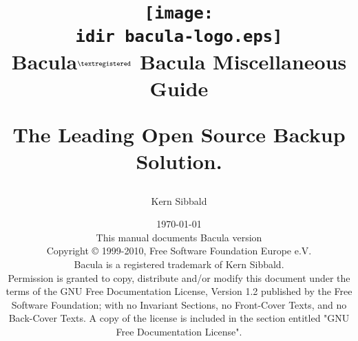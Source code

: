 \parskip 10pt
\parindent 0pt

\title{\texttt{[image: \\idir bacula-logo.eps]} \\ \bigskip
  \Huge{Bacula}$^{\normalsize \textregistered}$ \Huge{Bacula Miscellaneous Guide}
  \begin{center}
   \large{The Leading Open Source Backup Solution. }
  \end{center}
}


\author{Kern Sibbald}
\date{\vspace{1.0in}\today \\
      This manual documents Bacula version  \\
      \vspace{0.2in}
      Copyright {\copyright} 1999-2010, Free Software Foundation Europe
      e.V. \\
      Bacula {\textregistered}  is a registered trademark of Kern Sibbald.\\
      \vspace{0.2in}
  Permission is granted to copy, distribute and/or modify this document under the terms of the
  GNU Free Documentation License, Version 1.2 published by the Free Software Foundation; 
  with no Invariant Sections, no Front-Cover Texts, and no Back-Cover Texts.
  A copy of the license is included in the section entitled "GNU Free Documentation License".
}

\maketitle
